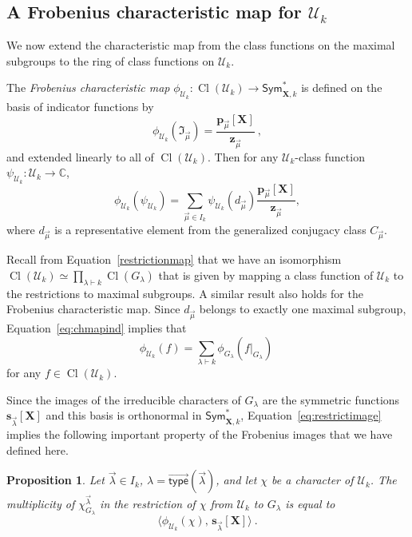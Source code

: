 \documentclass[10pt]{amsart}
\newtheorem{prop}[theorem]{Proposition}
\theoremstyle{definition}
\theoremstyle{remark}
\newcommand{\defncolor}{\color{darkred}}
\newcommand{\defn}[1]{{\defncolor\emph{#1}}} %
\newcommand{\CC}{\mathbb C}
\newcommand{\ind}{\mathfrak{I}}
\newcommand{\vtype}{\overrightarrow{\mathsf{type}}}
\newcommand{\XXX}{\mathbf{X}}
\newcommand{\class}{\operatorname{Cl}}
\begin{document}
\subsection{A Frobenius characteristic map for $\mathcal{U}_k$}
\label{subsec:UkFrob}
We now extend the characteristic map from the class functions
on the maximal subgroups to the ring of class functions
on $\mathcal{U}_k$.

The \defn{Frobenius characteristic map}
$\phi_{\mathcal{U}_k}: \class(\mathcal{U}_k) \to \mathsf{Sym}^{\ast}_{\XXX,k}$
is defined on the basis of indicator functions by
\begin{equation}\label{eq:chmapind}
\phi_{\mathcal{U}_k}( \ind_{\vec{\mu}} ) = \frac{\mathbf{p}_{\vec{\mu}}[\XXX]}{\mathbf{z}_{\vec{\mu}}}~,
\end{equation}
and extended linearly to all of $\class(\mathcal{U}_k)$.
Then for any $\mathcal{U}_k$-class function
$\psi_{\mathcal{U}_k} \colon \mathcal{U}_k \rightarrow \CC$,
\begin{equation}
\label{equation.phi Uk}
    \phi_{\mathcal{U}_k}( \psi_{\mathcal{U}_k} ) = \sum_{\vec{\mu}\in I_k}
    \psi_{\mathcal{U}_k}(d_{\vec{\mu}}) \frac{\mathbf{p}_{\vec{\mu}}[\XXX]}{\mathbf{z}_{\vec{\mu}}},
\end{equation}
where $d_{\vec{\mu}}$ is a representative element from the
generalized conjugacy class $C_{\vec{\mu}}$.

Recall from Equation~\eqref{restrictionmap} that we have an isomorphism
$\class(\mathcal{U}_k) \simeq \prod_{\lambda \vdash k} \class(G_\lambda)$
that is given by mapping a class function of $\mathcal{U}_k$ to the
restrictions to maximal subgroups.
A similar result also holds for the Frobenius characteristic map.
Since $d_{\vec{\mu}}$ belongs to exactly one maximal subgroup,
Equation~\eqref{eq:chmapind} implies that
\begin{equation}\label{eq:restrictimage}
\phi_{\mathcal{U}_k}( f ) = \sum_{\lambda \vdash k}
\phi_{G_\lambda}( f |_{G_\lambda})~
\end{equation}
for any $f \in \class({\mathcal{U}_k})$.

Since the images of the irreducible characters of $G_\lambda$ are the symmetric
functions $\mathbf{s}_{\vec{\lambda}}[\XXX]$
and this basis is orthonormal in $\mathsf{Sym}^{\ast}_{\XXX,k}$,
Equation~\eqref{eq:restrictimage} implies the following important property
of the Frobenius images that we have defined here.

\begin{prop}\label{prop:multiplicity}
Let $\vec{\lambda} \in I_k$, $\lambda = \vtype(\vec{\lambda})$,
and let $\chi$ be a character of $\mathcal{U}_k$.
The multiplicity of $\chi_{G_\lambda}^{\vec{\lambda}}$
in the restriction of $\chi$ from $\mathcal{U}_k$ to $G_\lambda$
is equal to
\[
    \big\langle \phi_{\mathcal{U}_k}( \chi ), \, \mathbf{s}_{\vec{\lambda}}[\XXX] \big\rangle~.
\]
\end{prop}
\end{document}
